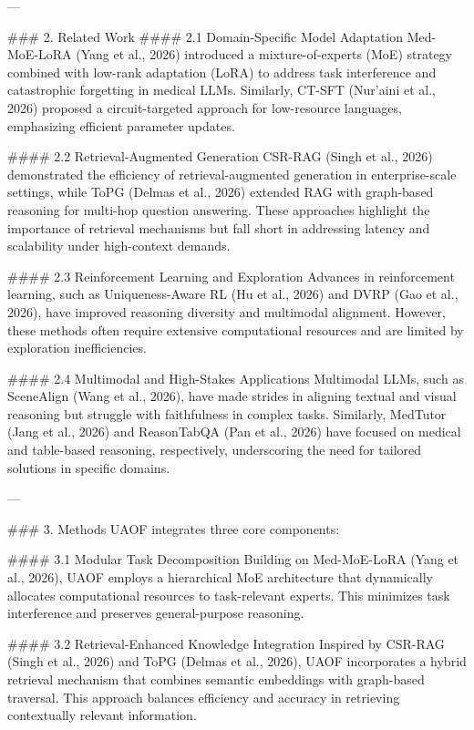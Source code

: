 ---

### 2. Related Work
#### 2.1 Domain-Specific Model Adaptation
Med-MoE-LoRA (Yang et al., 2026) introduced a mixture-of-experts (MoE) strategy combined with low-rank adaptation (LoRA) to address task interference and catastrophic forgetting in medical LLMs. Similarly, CT-SFT (Nur’aini et al., 2026) proposed a circuit-targeted approach for low-resource languages, emphasizing efficient parameter updates.

#### 2.2 Retrieval-Augmented Generation
CSR-RAG (Singh et al., 2026) demonstrated the efficiency of retrieval-augmented generation in enterprise-scale settings, while ToPG (Delmas et al., 2026) extended RAG with graph-based reasoning for multi-hop question answering. These approaches highlight the importance of retrieval mechanisms but fall short in addressing latency and scalability under high-context demands.

#### 2.3 Reinforcement Learning and Exploration
Advances in reinforcement learning, such as Uniqueness-Aware RL (Hu et al., 2026) and DVRP (Gao et al., 2026), have improved reasoning diversity and multimodal alignment. However, these methods often require extensive computational resources and are limited by exploration inefficiencies.

#### 2.4 Multimodal and High-Stakes Applications
Multimodal LLMs, such as SceneAlign (Wang et al., 2026), have made strides in aligning textual and visual reasoning but struggle with faithfulness in complex tasks. Similarly, MedTutor (Jang et al., 2026) and ReasonTabQA (Pan et al., 2026) have focused on medical and table-based reasoning, respectively, underscoring the need for tailored solutions in specific domains.

---

### 3. Methods
UAOF integrates three core components:

#### 3.1 Modular Task Decomposition
Building on Med-MoE-LoRA (Yang et al., 2026), UAOF employs a hierarchical MoE architecture that dynamically allocates computational resources to task-relevant experts. This minimizes task interference and preserves general-purpose reasoning.

#### 3.2 Retrieval-Enhanced Knowledge Integration
Inspired by CSR-RAG (Singh et al., 2026) and ToPG (Delmas et al., 2026), UAOF incorporates a hybrid retrieval mechanism that combines semantic embeddings with graph-based traversal. This approach balances efficiency and accuracy in retrieving contextually relevant information.

